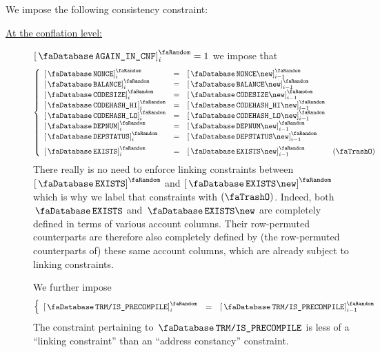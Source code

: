 We impose the following consistency constraint:
\begin{description}
	\item[\underline{At the conflation level:}]
		\If $\accAgainInConflation_{i} = 1$
		\Then we impose that
		\[
			\left\{ \begin{array}{lclr}
				\order{\accNonce            } _{i} & = & \order{\accNonce            \new } _{i - 1}              \\
				\order{\accBalance          } _{i} & = & \order{\accBalance          \new } _{i - 1}              \\
				\order{\accCodesize         } _{i} & = & \order{\accCodesize         \new } _{i - 1}              \\
				\order{\accCodehashHi       } _{i} & = & \order{\accCodehashHi       \new } _{i - 1}              \\
				\order{\accCodehashLo       } _{i} & = & \order{\accCodehashLo       \new } _{i - 1}              \\
				\order{\accDeploymentNumber } _{i} & = & \order{\accDeploymentNumber \new } _{i - 1}              \\
				\order{\accDeploymentStatus } _{i} & = & \order{\accDeploymentStatus \new } _{i - 1} \vspace{2mm} \\
				\order{\accExists           } _{i} & = & \order{\accExists           \new } _{i - 1}               & (\trash) \\
			\end{array} \right.
		\]
		\saNote{}
		There really is no need to enforce linking constraints between $\order{\accExists}$ and $\order{\accExists \new}$
		which is why we label that constraints with $(\trash)$.
		Indeed, both $\accExists$ and $\accExists \new$ are completely defined in terms of various account columns.
		Their row-permuted counterparts are therefore also completely defined by (the row-permuted counterparts of) these same account columns,
		which are already subject to linking constraints.

		We further impose
		\[
			\left\{ \begin{array}{lclr}
				\order{\accTrmIsPrecompile}_{i}   & = & \order{\accTrmIsPrecompile} _{i - 1} \\
			\end{array} \right.
		\]
		\saNote{}
		The constraint pertaining to $\accTrmIsPrecompile$ is less of a ``linking constraint''
		than an ``address constancy'' constraint.


\end{description}
